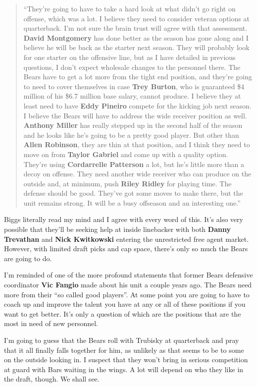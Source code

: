 \documentclass[11pt]{article}
\begin{document}
\begin{itemize}
\begin{quote}
``They’re going to have to take a hard look at what didn’t go right on offense, which was a lot. I believe they need to consider veteran options at quarterback. I’m not sure the brain trust will agree with that assessment. \textbf{David Montgomery} has done better as the season has gone along and I believe he will be back as the starter next season. They will probably look for one starter on the offensive line, but as I have detailed in previous questions, I don’t expect wholesale changes to the personnel there. The Bears have to get a lot more from the tight end position, and they’re going to need to cover themselves in case \textbf{Trey Burton}, who is guaranteed \$4 million of his \$6.7 million base salary, cannot produce. I believe they at least need to have \textbf{Eddy Pineiro} compete for the kicking job next season. I believe the Bears will have to address the wide receiver position as well. \textbf{Anthony Miller} has really stepped up in the second half of the season and he looks like he’s going to be a pretty good player. But other than \textbf{Allen Robinson}, they are thin at that position, and I think they need to move on from \textbf{Taylor Gabriel} and come up with a quality option. They’re using \textbf{Cordarrelle Patterson} a lot, but he’s little more than a decoy on offense. They need another wide receiver who can produce on the outside and, at minimum, push \textbf{Riley Ridley} for playing time. The defense should be good. They’ve got some moves to make there, but the unit remains strong. It will be a busy offseason and an interesting one.''
\end{quote}

Biggs literally read my mind and I agree with every word of this.  It's also very possible that they'll be seeking help at inside linebacker with both \textbf{Danny Trevathan} and \textbf{Nick Kwitkowski} entering the unrestricted free agent market.  However, with limited draft picks and cap space, there's only so much the Bears are going to do.

I'm reminded of one of the more profound statements that former Bears defensive coordinator \textbf{Vic Fangio} made about his unit a couple years ago.  The Bears need more from their ``so called good players''.  At some point you are going to have to coach up and improve the talent you have at any or all of these positions if you want to get better.  It's only a question of which are the positions that are the most in need of new personnel.

I'm going to guess that the Bears roll with Trubisky at quarterback and pray that it all finally falls together for him, as unlikely as that seems to be to some on the outside looking in.  I suspect that they won't bring in serious competition at guard with Bars waiting in the wings.  A lot will depend on who they like in the draft, though.  We shall see.
 

\end{itemize}
\end{document}

